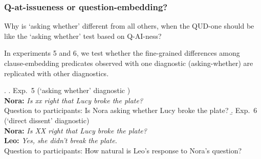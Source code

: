 \documentclass[compress, xcolor = dvipsnames, aspectratio=169]{beamer}
\begin{document}
	\begin{frame}[t]\frametitle{Q-at-issueness or question-embedding?}\scriptsize
		
		Why is `asking whether' different from all others, when the QUD-one should be like the `asking whether' test based on Q-AI-ness?

		In experiments 5 and 6, we test whether the fine-grained differences among clause-embedding predicates observed with one diagnostic (asking-whether) are replicated with other diagnostics.

		\ex.
	    \a.\label{exp5} Exp.~5 (`asking whether' diagnostic )
	    \\ {\bf Nora:} \emph{Is xx right that Lucy broke the plate?}
	    \\ Question to participants: Is Nora asking whether Lucy broke the plate?
	    \b.\label{exp6} Exp.~6 (`direct dissent' diagnostic)
	    \\ {\bf Nora:} \emph{Is XX right that Lucy broke the plate?}
	    \\ {\bf Leo:} \emph{Yes, she didn't break the plate.}
	    \\ Question to participants: How natural is Leo's response to Nora's question?
	
	\end{frame}
\end{document}

